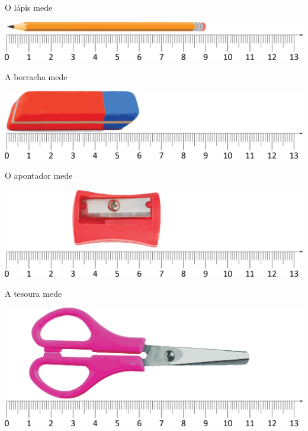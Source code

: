 \begin{escolha}

\item O lápis mede 

\noindent\includegraphics[width=\textwidth]{./media/image42.png}

\item A borracha mede 

\noindent\includegraphics[width=\textwidth]{./media/image43.png}

\item O apontador mede 

\noindent\includegraphics[width=\textwidth]{./media/image44.png}

\item A tesoura mede 

\noindent\includegraphics[width=\textwidth]{./media/image45.png}
\end{escolha}


